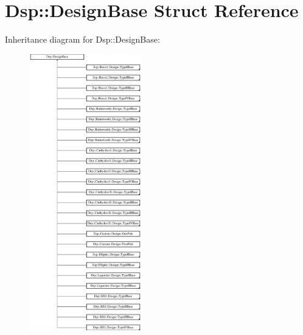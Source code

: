 \hypertarget{structDsp_1_1DesignBase}{\section{Dsp\-:\-:Design\-Base Struct Reference}
\label{structDsp_1_1DesignBase}
}
Inheritance diagram for Dsp\-:\-:Design\-Base\-:\begin{figure}[H]
\begin{center}
\leavevmode
\includegraphics[height=12.000000cm]{structDsp_1_1DesignBase}
\end{center}
\end{figure}
